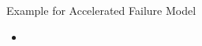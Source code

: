 \documentclass{beamer}
\begin{document}
           \begin{frame}{Example for Accelerated Failure Model}
        \begin{itemize}
            \item 
           
        \end{itemize}
    \end{frame}
\end{document}
